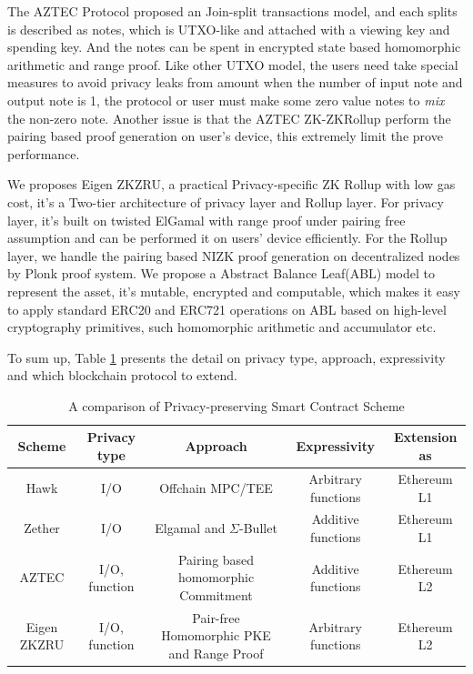 \documentclass{article}
\begin{document}


The AZTEC Protocol \cite{williamson2018aztec} proposed an Join-split transactions model, and each splits is described as notes, which is UTXO-like and attached with a viewing key and spending key. And the notes can be spent in encrypted state based homomorphic arithmetic and range proof. Like other UTXO model, the users need take special measures to avoid privacy leaks from amount when the number of input note and output note is 1, the protocol or user must make some zero value notes to \textit{mix} the non-zero note. Another issue is that the AZTEC ZK-ZKRollup perform the pairing based proof generation on user's device, this extremely limit the prove performance. 

We proposes Eigen ZKZRU, a practical Privacy-specific ZK Rollup with low gas cost, it's a Two-tier architecture of privacy layer and Rollup layer. For privacy layer, it's built on twisted ElGamal with range proof under pairing free assumption and can be performed it on users' device efficiently. For the Rollup layer, we handle the pairing based NIZK proof generation on decentralized nodes by Plonk proof system. We propose a Abstract Balance Leaf(ABL) model to represent the asset, it's mutable, encrypted and computable, which makes it easy to apply standard ERC20 and ERC721 operations on ABL based on high-level cryptography primitives, such homomorphic arithmetic and accumulator etc.

To sum up, Table \ref{tab:compare} presents the detail on privacy type, approach, expressivity and which blockchain protocol to extend.  

\begin{table}
\resizebox{\textwidth}{!} {
\begin{tabular}{c|c|c|c|c}
Scheme & Privacy type & Approach & Expressivity & Extension as \\\hline
Hawk & I/O & Offchain MPC/TEE & Arbitrary functions & Ethereum L1 \\
Zether & I/O & Elgamal and $\Sigma$-Bullet & Additive functions & Ethereum L1\\
AZTEC & I/O, function & Pairing based homomorphic Commitment & Additive functions & Ethereum L2\\
Eigen ZKZRU & I/O, function & Pair-free Homomorphic PKE and Range Proof & Arbitrary functions & Ethereum L2
\end{tabular}
}
\caption{\label{tab:compare}A comparison of Privacy-preserving Smart Contract Scheme}
\end{table}
\end{document}
